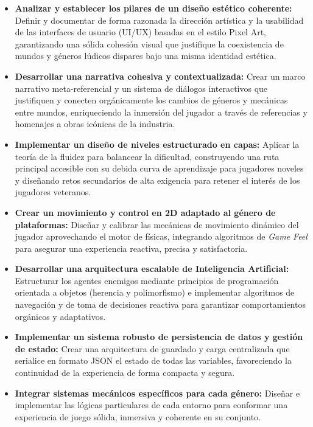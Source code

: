 \begin{itemize}
    \item \textbf{Analizar y establecer los pilares de un diseño estético coherente:} Definir y documentar de forma razonada la dirección artística y la usabilidad de las interfaces de usuario (UI/UX) basadas en el estilo Pixel Art, garantizando una sólida cohesión visual que justifique la coexistencia de mundos y géneros lúdicos dispares bajo una misma identidad estética.
    
    \item \textbf{Desarrollar una narrativa cohesiva y contextualizada:} Crear un marco narrativo meta-referencial y un sistema de diálogos interactivos que justifiquen y conecten orgánicamente los cambios de géneros y mecánicas entre mundos, enriqueciendo la inmersión del jugador a través de referencias y homenajes a obras icónicas de la industria.
    
    \item \textbf{Implementar un diseño de niveles estructurado en capas:} Aplicar la teoría de la fluidez para balancear la dificultad, construyendo una ruta principal accesible con su debida curva de aprendizaje para jugadores noveles y diseñando retos secundarios de alta exigencia para retener el interés de los jugadores veteranos.

    \item \textbf{Crear un movimiento y control en 2D adaptado al género de plataformas:} Diseñar y calibrar las mecánicas de movimiento dinámico del jugador aprovechando el motor de físicas, integrando algoritmos de \textit{Game Feel} para asegurar una experiencia reactiva, precisa y satisfactoria.

    \item \textbf{Desarrollar una arquitectura escalable de Inteligencia Artificial:} Estructurar los agentes enemigos mediante principios de programación orientada a objetos (herencia y polimorfismo) e implementar algoritmos de navegación y de toma de decisiones reactiva para garantizar comportamientos orgánicos y adaptativos.

    \item \textbf{Implementar un sistema robusto de persistencia de datos y gestión de estado:} Crear una arquitectura de guardado y carga centralizada que serialice en formato JSON el estado de todas las variables, favoreciendo la continuidad de la experiencia de forma compacta y segura.

   \item \textbf{Integrar sistemas mecánicos específicos para cada género:} Diseñar e implementar las lógicas particulares de cada entorno para conformar una experiencia de juego sólida, inmersiva y coherente en su conjunto.
\end{itemize}